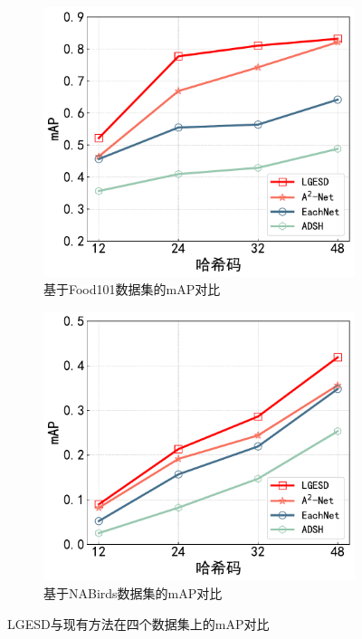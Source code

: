 \begin{figure}[h]
\begin{subfigure}{0.48\textwidth}
  \end{subfigure}
  \hfil
  \begin{subfigure}{0.48\textwidth}
    \centering
    \includegraphics[width=\linewidth]{./Img/Food-R50.pdf}
    \caption{基于Food101数据集的mAP对比}\label{fig:4-31}
  \end{subfigure}
  \hfil
  \begin{subfigure}{0.48\textwidth}
    \centering
    \includegraphics[width=\linewidth]{./Img/Nabirds-R50.pdf}
    \caption{基于NABirds数据集的mAP对比}\label{fig:4-32}
  \end{subfigure}
  \caption{LGESD与现有方法在四个数据集上的mAP对比}
  \label{fig:4-32-a}
\end{figure}

